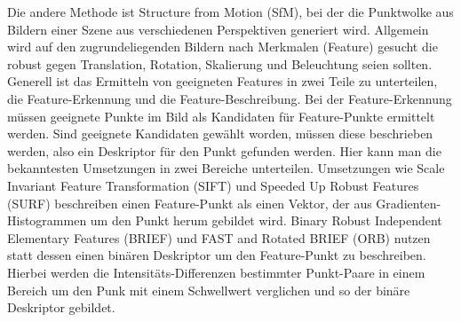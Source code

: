 \documentclass[12pt,titlepage, twoside]{article}
\begin{document}
Die andere Methode ist Structure from Motion (SfM), bei der die Punktwolke aus Bildern einer Szene aus verschiedenen Perspektiven generiert wird. 
Allgemein wird auf den zugrundeliegenden Bildern nach Merkmalen (Feature) gesucht die robust gegen Translation, Rotation, Skalierung und Beleuchtung seien sollten. 
Generell ist das Ermitteln von geeigneten Features in zwei Teile zu unterteilen, die Feature-Erkennung und die Feature-Beschreibung. 
Bei der Feature-Erkennung müssen geeignete Punkte im Bild als Kandidaten für Feature-Punkte ermittelt werden. 
Sind geeignete Kandidaten gewählt worden, müssen diese beschrieben werden, also ein Deskriptor für den Punkt gefunden werden. Hier kann man die bekanntesten Umsetzungen in zwei Bereiche unterteilen. 
Umsetzungen wie Scale Invariant Feature Transformation (SIFT) \cite{Sift} und Speeded Up Robust Features (SURF) \cite{SURF} beschreiben einen Feature-Punkt als einen Vektor, der aus Gradienten-Histogrammen um den Punkt herum gebildet wird.
Binary Robust Independent Elementary Features (BRIEF) \cite{BRIEF} und FAST and Rotated BRIEF (ORB) \cite{ORB} nutzen statt dessen einen binären Deskriptor um den Feature-Punkt zu beschreiben. 
Hierbei werden die Intensitäts-Differenzen bestimmter Punkt-Paare in einem Bereich um den Punk mit einem Schwellwert verglichen und so der binäre Deskriptor gebildet.
\end{document}
